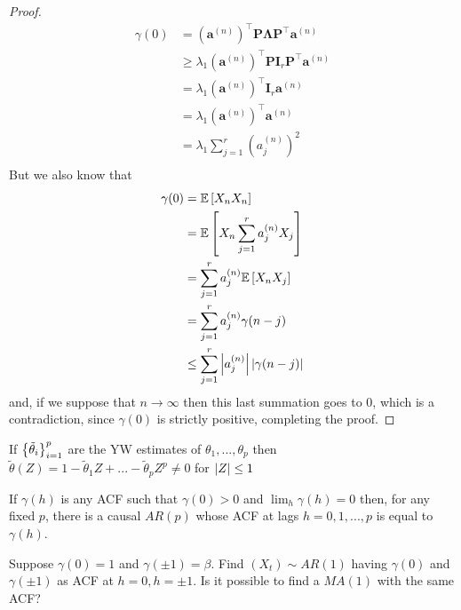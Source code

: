 \begin{proof}
    \begin{equation*}
        \begin{split}
            \gamma(0)&=(\boldsymbol{a}^{(n)})^\intercal\boldsymbol{P}\boldsymbol{\Lambda}\boldsymbol{P}^\intercal\boldsymbol{a}^{(n)}\\
            &\ge\lambda_1(\boldsymbol{a}^{(n)})^\intercal\boldsymbol{P}\boldsymbol{I}_r\boldsymbol{P}^\intercal\boldsymbol{a}^{(n)}\\
            &=\lambda_1(\boldsymbol{a}^{(n)})^\intercal\boldsymbol{I}_r\boldsymbol{a}^{(n)}\\
            &=\lambda_1(\boldsymbol{a}^{(n)})^\intercal\boldsymbol{a}^{(n)}\\
            &=\lambda_1\sum_{j=1}^r(a_j^{(n)})^2\\
        \end{split}
    \end{equation*}
    But we also know that
    \begin{equation*}
        \begin{split}
            \gamma(0)&=\mathbb{E}\left[X_nX_n\right]\\
            &=\mathbb{E}\left[X_n\sum_{j=1}^ra_j^{(n)}X_j\right]\\
            &=\sum_{j=1}^ra_j^{(n)}\mathbb{E}\left[X_nX_j\right]\\
            &=\sum_{j=1}^ra_j^{(n)}\gamma(n-j)\\
            &\le\sum_{j=1}^r\left|a_j^{(n)}\right|\left|\gamma(n-j)\right|\\
        \end{split}
    \end{equation*}
    and, if we suppose that $n\to\infty$ then this last summation goes to $0$, which is a contradiction, since $\gamma(0)$ is strictly positive, completing the proof.
\end{proof}

\begin{proposition}
    If $\left\{\tilde{\theta}_i\right\}_{i=1}^p$ are the YW estimates of $\theta_1,...,\theta_p$ then $\tilde{\theta}(Z)=1-\tilde{\theta}_1Z+...-\tilde{\theta}_pZ^p\ne0$ for $\left|Z\right|\le1$
\end{proposition}

\begin{remark}
    If $\gamma(h)$ is any ACF such that $\gamma(0)>0$ and $\lim_h\gamma(h)=0$ then, for any fixed $p$, there is a causal $AR(p)$ whose ACF at lags $h=0,1,...,p$ is equal to $\gamma(h)$.
\end{remark}

\begin{exercise}
    Suppose $\gamma(0)=1$ and $\gamma(\pm1)=\beta$. Find $(X_t)\sim AR(1)$ having $\gamma(0)$ and $\gamma(\pm1)$ as ACF at $h=0, h=\pm1$. Is it possible to find a $MA(1)$ with the same ACF?
\end{exercise}

